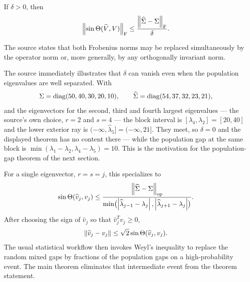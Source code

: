 
\begin{theorem}
If $\delta>0$, then
\[
  \left\lVert \sin\Theta(\widehat V,V)\right\rVert_{\mathrm{F}}
  \le
  \frac{\left\lVert \widehat\Sigma-\Sigma\right\rVert_{\mathrm{F}}}{\delta}.
\]
\end{theorem}
The source states that both Frobenius norms may be replaced simultaneously by the operator norm or, more generally, by any orthogonally invariant norm.


The source immediately illustrates that $\delta$ can vanish even when the population eigenvalues are well separated. With
\[
  \Sigma=\operatorname{diag}(50,40,30,20,10),
  \qquad
  \widehat\Sigma=\operatorname{diag}(54,37,32,23,21),
\]
and the eigenvectors for the second, third and fourth largest eigenvalues --- the source's own choice, $r=2$ and $s=4$ --- the block interval is $[\lambda_4,\lambda_2]=[20,40]$ and the lower exterior ray is $(-\infty,\widehat\lambda_5]=(-\infty,21]$. They meet, so $\delta=0$ and the displayed theorem has no content there --- while the population gap at the same block is $\min(\lambda_1-\lambda_2,\lambda_4-\lambda_5)=10$. This is the motivation for the population-gap theorem of the next section.

For a single eigenvector, $r=s=j$, this specializes to
\[
  \sin\Theta(\widehat v_j,v_j)
  \le
  \frac{\left\lVert \widehat\Sigma-\Sigma\right\rVert_{\mathrm{op}}}
       {\min\bigl(
          \left\lvert \widehat\lambda_{j-1}-\lambda_j\right\rvert,
          \left\lvert \widehat\lambda_{j+1}-\lambda_j\right\rvert
        \bigr)}.
\]
After choosing the sign of $\widehat v_j$ so that $\widehat v_j^Tv_j\ge0$,
\[
  \left\lVert \widehat v_j-v_j\right\rVert
  \le\sqrt2\sin\Theta(\widehat v_j,v_j).
\]
The usual statistical workflow then invokes Weyl's inequality to replace the random mixed gaps by fractions of the population gaps on a high-probability event. The main theorem eliminates that intermediate event from the theorem statement.

